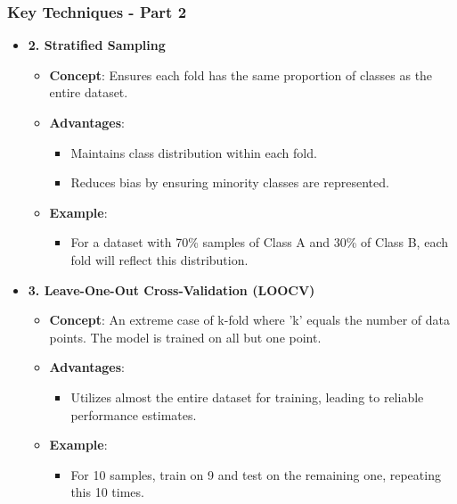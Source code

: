 \documentclass[aspectratio=169]{beamer}
\begin{document}
\begin{frame}[fragile]
    \frametitle{Key Techniques - Part 2}
    \begin{itemize}
        \item \textbf{2. Stratified Sampling}
        \begin{itemize}
            \item \textbf{Concept}: Ensures each fold has the same proportion of classes as the entire dataset.
            \item \textbf{Advantages}:
            \begin{itemize}
                \item Maintains class distribution within each fold.
                \item Reduces bias by ensuring minority classes are represented.
            \end{itemize}
            \item \textbf{Example}:
            \begin{itemize}
                \item For a dataset with 70\% samples of Class A and 30\% of Class B, each fold will reflect this distribution.
            \end{itemize}
        \end{itemize}
        
        \item \textbf{3. Leave-One-Out Cross-Validation (LOOCV)}
        \begin{itemize}
            \item \textbf{Concept}: An extreme case of k-fold where 'k' equals the number of data points. The model is trained on all but one point.
            \item \textbf{Advantages}:
            \begin{itemize}
                \item Utilizes almost the entire dataset for training, leading to reliable performance estimates.
            \end{itemize}
            \item \textbf{Example}:
            \begin{itemize}
                \item For 10 samples, train on 9 and test on the remaining one, repeating this 10 times.
            \end{itemize}
        \end{itemize}
    \end{itemize}
\end{frame}
\end{document}
